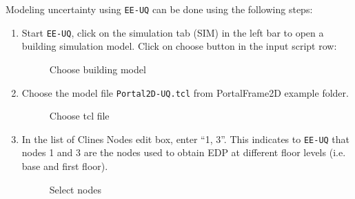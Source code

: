 Modeling uncertainty using \texttt{EE-UQ} can be done using the
following steps:
\begin{enumerate}
\item	 Start \texttt{EE-UQ}, click on the simulation tab (SIM) in the left bar to open a building simulation model. Click on choose button in the input script row:

\begin{figure}[!htbp]
  \caption{Choose building model}
  \label{fig:figure21}
\end{figure}

\item	 Choose the model file \texttt{Portal2D-UQ.tcl} from PortalFrame2D example folder.
\begin{figure}[!htbp]
  \caption{Choose tcl file}
  \label{fig:figure22}
\end{figure}


\item	 In the list of Clines Nodes edit box, enter “1, 3”. This indicates to \texttt{EE-UQ} that nodes 1 and 3 are the nodes used to obtain EDP at different floor levels (i.e. base and first floor).
\begin{figure}[!htbp]
  \caption{Select nodes}
  \label{fig:figure23}
\end{figure}


\end{enumerate}
